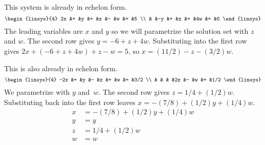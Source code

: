 \begin{frame}
\ex
This system is already in echelon form.
\begin{equation*}
  \begin{linsys}{4}
    2x  &+   &y     &+  &z   &-   &w  &= &5  \\
        &   &-y   &+   &z   &+   &4w &= &6 
  \end{linsys} 
\end{equation*}
The leading variables are $x$ and $y$ so we will 
parametrize the solution set with $z$ and $w$.
\pause
The second row gives $y=-6+z+4w$.
Substituting into the first row gives
$2x+(-6+z+4w)+z-w=5$,
so $x=(11/2)-z-(3/2)w$.

\pause
\ex
This is also already in echelon form.
\begin{equation*}
  \begin{linsys}{4}
   -2x  &+  &y  &-  &z   &+   &w  &= &3/2  \\
        &   &   &   &2z  &-   &w  &= &1/2 
  \end{linsys} 
\end{equation*}
We parametrize with $y$ and~$w$.
The second row gives $z=1/4+(1/2)w$.
Substituting back into the first row leaves
$x=-(7/8)+(1/2)y+(1/4)w$.
\pause
\begin{align*}
  x &= -(7/8)+(1/2)y+(1/4)w  \\
  y &= y   \\
  z &= 1/4+(1/2)w   \\
  w &= w
\end{align*}
\end{frame}




